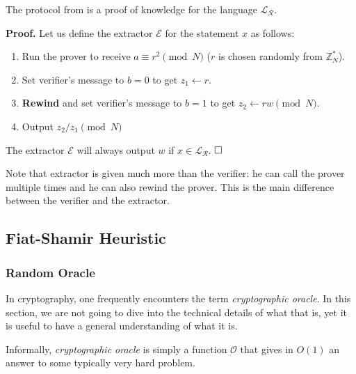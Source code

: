 \documentclass[../lecture-notes.tex]{subfiles}
\begin{document}
\begin{lemma}
    The protocol from  is a proof of knowledge for the language $\mathcal{L}_{\mathcal{R}}$. 
\end{lemma}

\textbf{Proof.} Let us define the extractor $\mathcal{E}$ for the statement $x$ as follows:
\begin{enumerate}
    \item Run the prover to receive $a \equiv r^2 \pmod{N}$ ($r$ is chosen randomly from $\mathbb{Z}_N^*$).
    \item Set verifier's message to $b=0$ to get $z_1 \gets r$.
    \item \textbf{Rewind} and set verifier's message to $b=1$ to get $z_2 \gets rw \pmod{N}$.
    \item Output $z_2/z_1 \pmod{N}$
\end{enumerate}

The extractor $\mathcal{E}$ will always output $w$ if $x \in \mathcal{L}_{\mathcal{R}}$. $\hfill\Box$

\begin{remark}
    Note that extractor is given much more than the verifier: he can call the prover multiple times and he can also rewind the prover. This is the main difference between the verifier and the extractor.    
\end{remark}

\subsection{Fiat-Shamir Heuristic}

\subsubsection{Random Oracle}

In cryptography, one frequently encounters the term \textit{cryptographic oracle}. In this section, we are not going to dive into the technical details of what that is, yet it is useful to have a general understanding of what it is.

\begin{definition}
    Informally, \textit{cryptographic oracle} is simply a function $\mathcal{O}$ that gives in $O(1)$ an answer to some typically very hard problem.     
\end{definition}
\end{document}
